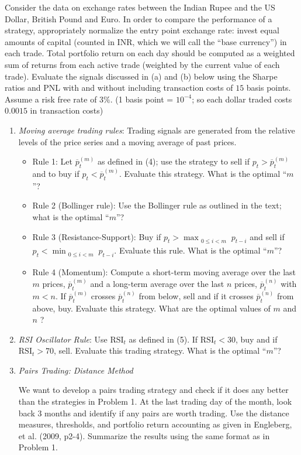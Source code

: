 \begin{enumerate}[1.]
Consider the data on exchange rates between the Indian Rupee and the US Dollar, British Pound and Euro. In order to compare the performance of a strategy, appropriately normalize the entry point exchange rate: invest equal amounts of capital (counted in INR, which we will call the ``base currency'') in each trade. Total portfolio return on each day should be computed as a weighted sum of returns from each active trade (weighted by the current value of each trade). Evaluate the signals discussed in (a) and (b) below using the Sharpe ratios and PNL with and without including transaction costs of $15$ basis points. Assume a risk free rate of $3\%$. (1 basis point = $10^{-4}$; so each dollar traded costs $0.0015$ in transaction costs)
\begin{enumerate}
\item{\it Moving average trading rules}: Trading signals are generated from the relative levels of the price series and a moving average of past prices.
\begin{itemize}
\item  Rule 1: Let $\overline{p}_t^{(m)}$ as defined in (4); use the strategy to sell if $p_t>\overline{p}_t^{(m)}$ and to buy if  $p_t<\overline{p}_t^{(m)}$. Evaluate this strategy. What is the optimal ``$m$''?
\item Rule 2 (Bollinger rule): Use the Bollinger rule as outlined in the text; what is the optimal ``$m$''?
\item Rule 3 (Resistance-Support): Buy if $p_t > \max_{\substack{0\le i< m}}p_{t-i}$ and sell if $p_t < \min_{\substack{0\le i< m}}p_{t-i}$. Evaluate this rule. What is the optimal ``$m$''?
\item Rule 4 (Momentum): Compute a short-term moving average over the last $m$ prices, $\overline{p}_t^{(m)}$ and a long-term average over the last $n$ prices, $\overline{p}_t^{(n)}$ with $m<n$. If $\overline{p}_t^{(m)}$ crosses $\overline{p}_t^{(n)}$ from below, sell and if it crosses $\overline{p}_t^{(n)}$ from above, buy. Evaluate this strategy. What are the optimal values of $m$ and $n$ ?
\end{itemize}
\item{\it RSI Oscillator Rule}: Use $\text{RSI}_t$ as defined in (5). \hfill \break
If $\text{RSI}_t<30$, buy and if $\text{RSI}_t>70$, sell. Evaluate this trading strategy. What is the optimal ``$m$''?

\item {\it Pairs Trading: Distance Method}

We want to develop a pairs trading strategy and check if it does any better than  the strategies in Problem 1. At the last trading day of the month, look back 3 months and identify if any pairs are worth trading. Use the distance measures, thresholds, and portfolio return accounting as given in Engleberg, et al. (2009, p2-4). Summarize the results using the same format as in Problem 1.


\end{enumerate}
\end{enumerate}
